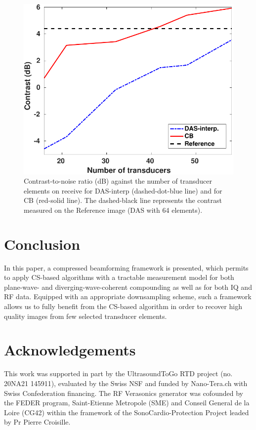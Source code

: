 \documentclass[conference]{IEEEtran}
\begin{document}
\begin{figure}[htb]
	\centering
	\includegraphics[scale = 0.4]{figures/CNR_DW_IUS2016.pdf}
	\caption{Contrast-to-noise ratio (dB) against the number of transducer elements on receive for DAS-interp (dashed-dot-blue line) and for CB (red-solid line). The dashed-black line represents the contrast measured on the Reference image (DAS with 64 elements).}
	\label{fig_CNR}
\end{figure}
\section{Conclusion}
\label{sec:Conc}
In this paper, a compressed beamforming framework is presented, which permits to apply CS-based algorithms with a tractable measurement model for both plane-wave- and diverging-wave-coherent compounding as well as for both IQ and RF data. Equipped with an appropriate downsampling scheme, such a framework allows us to fully benefit from the CS-based algorithm in order to recover high quality images from few selected transducer elements.
\section*{Acknowledgements}
This work was supported in part by the UltrasoundToGo RTD project (no. 20NA21 145911), evaluated by the Swiss NSF and funded by Nano-Tera.ch with Swiss Confederation financing. The RF Verasonics generator was cofounded by the FEDER
program, Saint-Etienne Metropole (SME) and Conseil General de la Loire (CG42) within the framework of the SonoCardio-Protection Project leaded by Pr Pierre Croisille.



\end{document}
